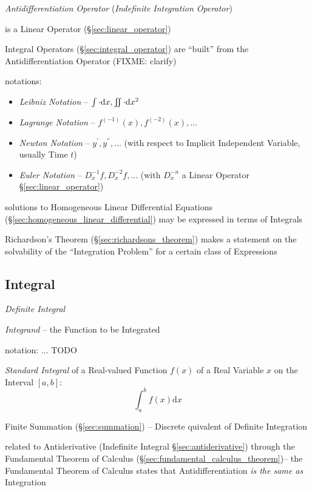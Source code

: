 \emph{Antidifferentiation Operator} (\emph{Indefinite Integration Operator})

is a Linear Operator (\S\ref{sec:linear_operator})

\fist Integral Operators (\S\ref{sec:integral_operator}) are ``built'' from the
Antidifferentiation Operator (FIXME: clarify)

notations:
\begin{itemize}
  \item \emph{Leibniz Notation} --
    $\int \cdot \mathrm{d}x, \iint \cdot \mathrm{d}x^2$
  \item \emph{Lagrange Notation} -- $f^{(-1)}(x), f^{(-2)}(x), \ldots$
  \item \emph{Newton Notation} -- $y^{'}, y^{''}, \ldots$ (with respect
    to Implicit Independent Variable, usually Time $t$)
  \item \emph{Euler Notation} -- $D^{-1}_x{f}, D^{-2}_x{f}, \ldots$ (with
    $D_x^{-n}$ a Linear  Operator \S\ref{sec:linear_operator})
\end{itemize}

solutions to Homogeneous Linear Differential Equations
(\S\ref{sec:homogeneous_linear_differential}) may be expressed in
terms of Integrals

Richardson's Theorem (\S\ref{sec:richardsons_theorem}) makes a statement on the
solvability of the ``Integration Problem'' for a certain class of Expressions



\subsection{Integral}\label{sec:integral}

\emph{Definite Integral}

\emph{Integrand} -- the Function to be Integrated

notation:
... TODO

\emph{Standard Integral} of a Real-valued Function $f(x)$ of a Real Variable $x$
on the Interval $[a,b]$:
\[
  \int_a^b f(x) \mathrm{d}x
\]

\fist Finite Summation (\S\ref{sec:summation}) -- Discrete quivalent of
Definite Integration

\fist related to Antiderivative (Indefinite Integral \S\ref{sec:antiderivative})
through the Fundamental Theorem of Calculus
(\S\ref{sec:fundamental_calculus_theorem})--
the Fundamental Theorem of Calculus states that Antidifferentiation \emph{is the
  same as} Integration

